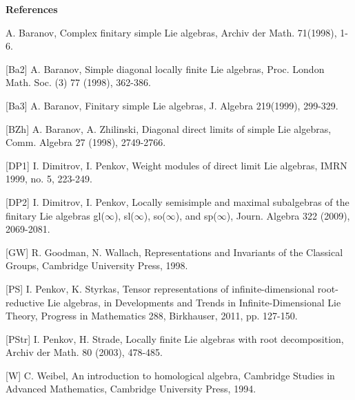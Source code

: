 \documentclass{birkmult}
\begin{document}
\bigskip
\pagebreak

\textbf{References}


\bigskip
[Ba1] A. Baranov, Complex finitary simple Lie algebras, Archiv der Math. 71(1998), 1-6.

\bigskip

[Ba2] A. Baranov, Simple diagonal locally finite Lie algebras,  Proc. London Math. Soc. (3)  77  (1998), 362-386.

\bigskip

[Ba3] A. Baranov, Finitary simple Lie algebras, J. Algebra 219(1999), 299-329.


[BZh] A. Baranov, A. Zhilinski, Diagonal direct limits of simple Lie algebras, Comm.
Algebra 27 (1998), 2749-2766.


\bigskip

[DP1] I. Dimitrov, I. Penkov, Weight modules of direct limit Lie algebras, IMRN 1999, no. 5, 223-249.

\bigskip

[DP2] I. Dimitrov, I. Penkov, Locally semisimple and maximal subalgebras of the finitary Lie algebras gl($\infty$), sl($\infty$), so($\infty$), and sp($\infty$), Journ. Algebra 322 (2009), 2069-2081.

\bigskip

[GW] R. Goodman, N. Wallach, Representations and Invariants of the Classical Groups,
Cambridge University Press, 1998.

\bigskip

[PS] I. Penkov, K. Styrkas, Tensor representations of infinite-dimensional root-reductive Lie algebras, in Developments and Trends in Infinite-Dimensional Lie Theory, Progress in Mathematics 288, Birkhauser, 2011, pp. 127-150.

\bigskip

[PStr] I. Penkov, H. Strade, Locally finite Lie algebras with root
decomposition, Archiv der Math. 80 (2003), 478-485.

\bigskip

[W] C. Weibel, An introduction to homological algebra, Cambridge Studies in Advanced Mathematics, Cambridge University Press, 1994.
\end{document}
